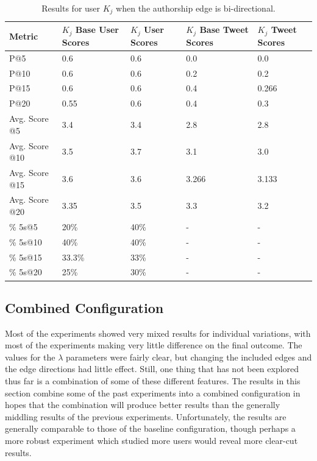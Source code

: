 \begin{table}
\centering
\begin{tabular}{l|p{2.2cm}|p{2.2cm}|p{2.2cm}|p{2.2cm}}
{\bf Metric} & {\bf $K_{j}$ Base User Scores} & {\bf $K_{j}$ User Scores} & {\bf $K_{j}$ Base Tweet Scores} & {\bf $K_{j}$ Tweet Scores} \\ \hline
P@5   & 0.6 & 0.6 & 0.0 & 0.0 \\ \hline
P@10 & 0.6 & 0.6 & 0.2 & 0.2 \\ \hline
P@15 & 0.6 & 0.6 & 0.4 & 0.266 \\ \hline
P@20 & 0.55 & 0.6 & 0.4 & 0.3 \\ \hline

Avg. Score @5   & 3.4 & 3.4 & 2.8 & 2.8 \\ \hline
Avg. Score @10 & 3.5 & 3.7 & 3.1 & 3.0 \\ \hline
Avg. Score @15 & 3.6 & 3.6 & 3.266 & 3.133 \\ \hline
Avg. Score @20 & 3.35 & 3.5 & 3.3 & 3.2 \\ \hline

\% 5s@5    & 20\% & 40\% & - & - \\ \hline
\% 5s@10  & 40\% & 40\% & - & - \\ \hline
\% 5s@15  & 33.3\% & 33\% & - & - \\ \hline
\% 5s@20  & 25\% & 30\% & - & - \\

\end{tabular}
\caption{Results for user $K_{j}$ when the authorship edge is bi-directional.}
\label{tab:BiDirectionalAuthorKj}
\end{table}



\subsection{Combined Configuration}
\label{sec:CombinedConfiguration}

Most of the experiments showed very mixed results for individual variations, with most of the experiments making very little difference on the final outcome. The values for the $\lambda$ parameters were fairly clear, but changing the included edges and the edge directions had little effect. Still, one thing that has not been explored thus far is a combination of some of these different features. The results in this section combine some of the past experiments into a combined configuration in hopes that the combination will produce better results than the generally middling results of the previous experiments. Unfortunately, the results are generally comparable to those of the baseline configuration, though perhaps a more robust experiment which studied more users would reveal more clear-cut results.

